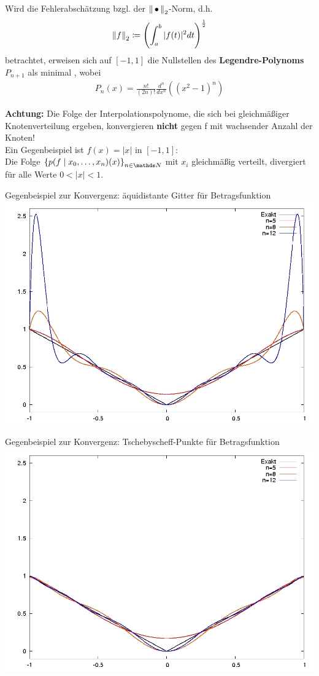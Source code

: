 Wird die Fehlerabschätzung bzgl. der 
$\nn_2$-Norm,
d.h. 
\begin{gather*}
  \nn[f]_2\coloneqq \left(\int_{a}^{b}|f(t)|^2dt \right)^\frac{1}{2}
\end{gather*}
betrachtet, erweisen sich auf $[-1,1]$ die Nullstellen
des \textbf{Legendre-Polynoms} $P_{n+1}$
als minimal \cite{haemmerlinhoffmann}, wobei
\begin{gather*}
  P_n(x) = \frac{n!}{(2n)!}\frac{d^n}{dx^n}\left((x^2-1)^n\right)
\end{gather*}


\textbf{Achtung:} Die Folge der Interpolationspolynome,
die sich bei gleichmäßiger Knotenverteilung ergeben,
konvergieren \textbf{nicht} gegen f mit wachsender Anzahl der Knoten!\\
Ein Gegenbeispiel ist $f(x)=|x|$ in $[-1,1]$:\\
Die Folge $\left\{p(f\mid x_0,\dots,x_n)(x)\right\}_{n\in\N}$
mit $x_i$ gleichmäßig verteilt,
divergiert für alle Werte $0<|x|<1$.

\begin{image}{Gegenbeispiel zur Konvergenz: äquidistante Gitter für Betragsfunktion}
  \includegraphics[width=0.5\linewidth]{images/afg49aequi.jpg}
\end{image}
\label{6.1.20im1}
\begin{image}{Gegenbeispiel zur Konvergenz: Tschebyscheff-Punkte für Betragsfunktion}
  \includegraphics[width=0.5\linewidth]{images/afg49tscheby.jpeg}
\end{image}
\label{6.1.20im2}

